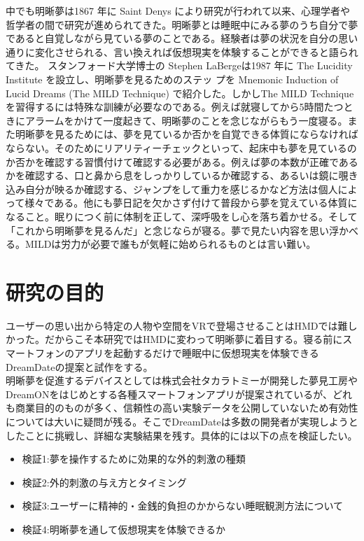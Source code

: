 中でも明晰夢は1867 年に Saint Denys により研究が行われて以来\cite{saintDenys}、心理学者や哲学者の間で研究が進められてきた。明晰夢とは睡眠中にみる夢のうち自分で夢であると自覚しながら見ている夢のことである。経験者は夢の状況を自分の思い通りに変化させられる、言い換えれば仮想現実を体験することができると語られてきた。 スタンフォード大学博士の Stephen LaBergeは1987 年に The Lucidity Institute を設立し、明晰夢を見るためのステッ プを Mnemonic Induction of Lucid Dreams (The MILD Technique) で紹介した\cite{LaBerge}。しかしThe MILD Techniqueを習得するには特殊な訓練が必要なのである。例えば就寝してから5時間たつときにアラームをかけて一度起きて、明晰夢のことを念じながらもう一度寝る。また明晰夢を見るためには、夢を見ているか否かを自覚できる体質にならなければならない。そのためにリアリティーチェックといって、起床中も夢を見ているのか否かを確認する習慣付けて確認する必要がある。例えば夢の本数が正確であるかを確認する、口と鼻から息をしっかりしているか確認する、あるいは鏡に覗き込み自分が映るか確認する、ジャンプをして重力を感じるかなど方法は個人によって様々である。他にも夢日記を欠かさず付けて普段から夢を覚えている体質になること。眠りにつく前に体制を正して、深呼吸をし心を落ち着かせる。そして「これから明晰夢を見るんだ」と念じならが寝る。夢で見たい内容を思い浮かべる。MILDは労力が必要で誰もが気軽に始められるものとは言い難い。


\section{研究の目的}
ユーザーの思い出から特定の人物や空間をVRで登場させることはHMDでは難しかった。だからこそ本研究ではHMDに変わって明晰夢に着目する。寝る前にスマートフォンのアプリを起動するだけで睡眠中に仮想現実を体験できるDreamDateの提案と試作をする。\\

明晰夢を促進するデバイスとしては株式会社タカラトミーが開発した夢見工房\cite{takaratomi}やDreamON\cite{dreamOn}をはじめとする各種スマートフォンアプリが提案されているが、どれも商業目的のものが多く、信頼性の高い実験データを公開していないため有効性については大いに疑問が残る。そこでDreamDateは多数の開発者が実現しようとしたことに挑戦し、詳細な実験結果を残す。具体的には以下の点を検証したい。

\begin{itemize}
\item 検証1:夢を操作するために効果的な外的刺激の種類
\item 検証2:外的刺激の与え方とタイミング
\item 検証3:ユーザーに精神的・金銭的負担のかからない睡眠観測方法について
\item 検証4:明晰夢を通して仮想現実を体験できるか
\end{itemize}

